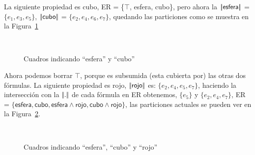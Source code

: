La siguiente propiedad es \textsf{cubo}, ER = \{$\top$, \textsf{esfera}, \textsf{cubo}\}, pero ahora la $|\!|\textsf{esfera}|\!|$ = $\{e_1, e_3, e_5\}$, $|\!|\textsf{cubo}|\!|$ = $\{e_2, e_4, e_6, e_7\}$, quedando las particiones como se muestra en la Figura~\ref{fig-modelo4}
\begin{figure}[ht]
\begin{center}
\\[0pt]
\caption{Cuadros indicando ``esfera'' y ``cubo''}
\label{fig-modelo4}
\end{center}
\end{figure}
Ahora podemos borrar $\top$, porque es subsumida (esta cubierta por) las otras dos f\'ormulas. La siguiente propiedad es  \textsf{rojo}, $|\!|\textsf{rojo}|\!|$ es: $\{e_2, e_4, e_5, e_7\}$, haciendo la intersecci\'on con la $|\!|.|\!|$ de cada f\'ormula en ER obtenemos, $\{e_5\}$ y $\{e_2, e_4, e_7\}$, ER = $\{\textsf{esfera}, \textsf{cubo}, \textsf{esfera} \wedge \textsf{rojo}, \textsf{cubo} \wedge \textsf{rojo}\}$, las particiones actuales se pueden ver en la Figura~\ref{fig-modelo9}.
\begin{figure}[ht]
\begin{center}
\\[0pt]
\caption{Cuadros indicando ``esfera'', ``cubo'' y ``rojo''}
\label{fig-modelo9}
\end{center}
\end{figure}

